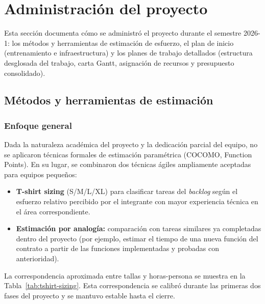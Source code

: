 \documentclass[12pt,oneside]{report}
\begin{document}
  \section{Administración del proyecto}
  \label{sec:administracion}

    Esta sección documenta cómo se administró el proyecto durante el semestre 2026-1: los métodos y herramientas de estimación de esfuerzo, el plan de inicio (entrenamiento e infraestructura) y los planes de trabajo detallados (estructura desglosada del trabajo, carta Gantt, asignación de recursos y presupuesto consolidado).

    \subsection{Métodos y herramientas de estimación}
    \label{subsec:estimacion}

      \subsubsection{Enfoque general}
      Dada la naturaleza académica del proyecto y la dedicación parcial del equipo, no se aplicaron técnicas formales de estimación paramétrica (COCOMO, Function Points). En su lugar, se combinaron dos técnicas ágiles ampliamente aceptadas para equipos pequeños:
      \begin{itemize}
        \item \textbf{T-shirt sizing} (S/M/L/XL) para clasificar tareas del \textit{backlog} según el esfuerzo relativo percibido por el integrante con mayor experiencia técnica en el área correspondiente.
        \item \textbf{Estimación por analogía:} comparación con tareas similares ya completadas dentro del proyecto (por ejemplo, estimar el tiempo de una nueva función del contrato a partir de las funciones implementadas y probadas con anterioridad).
      \end{itemize}

      La correspondencia aproximada entre tallas y horas-persona se muestra en la Tabla~\ref{tab:tshirt-sizing}. Esta correspondencia se calibró durante las primeras dos fases del proyecto y se mantuvo estable hasta el cierre.
\end{document}
